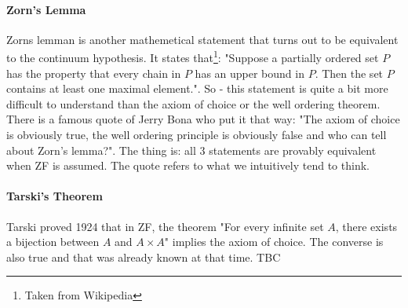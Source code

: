 


\paragraph{Zorn's Lemma}
Zorns lemman is another mathemetical statement that turns out to be equivalent to the continuum hypothesis. It states that\footnote{Taken from Wikipedia}: "Suppose a partially ordered set $P$ has the property that every chain in $P$ has an upper bound in $P$. Then the set $P$ contains at least one maximal element.". So - this statement is quite a bit more difficult to understand than the axiom of choice or the well ordering theorem. There is a famous quote of Jerry Bona who put it that way: "The axiom of choice is obviously true, the well ordering principle is obviously false and who can tell about Zorn's lemma?". The thing is: all 3 statements are provably equivalent when ZF is assumed. The quote refers to what we intuitively tend to think. %



\paragraph{Tarski's Theorem}
Tarski proved 1924 that in ZF, the theorem "For every infinite set $A$, there exists a bijection between $A$ and $A \times A$" implies the axiom of choice. The converse is also true and that was already known at that time.  TBC


